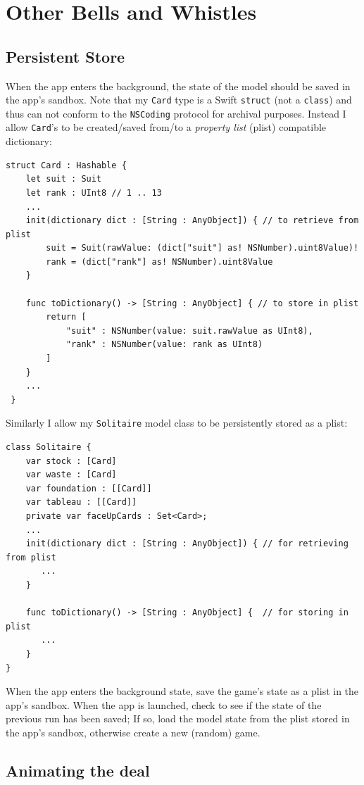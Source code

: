 \documentclass[11pt]{article}
\begin{document}
\section{Other Bells and Whistles} \label{sec:bells-and-whistles}

\subsection{Persistent Store}

When the app enters the background, the state of the model should
be saved in the app's sandbox. 
Note that my {\tt Card} type is a Swift {\tt struct} (not a {\tt class})
and thus can not conform to the {\tt NSCoding} protocol for archival purposes.
Instead I allow {\tt Card}'s to be created/saved from/to a {\em property
list} (plist) compatible dictionary:
\begin{verbatim}
struct Card : Hashable {
    let suit : Suit
    let rank : UInt8 // 1 .. 13
    ...
    init(dictionary dict : [String : AnyObject]) { // to retrieve from plist
        suit = Suit(rawValue: (dict["suit"] as! NSNumber).uint8Value)!
        rank = (dict["rank"] as! NSNumber).uint8Value
    }
    
    func toDictionary() -> [String : AnyObject] { // to store in plist
        return [
            "suit" : NSNumber(value: suit.rawValue as UInt8),
            "rank" : NSNumber(value: rank as UInt8)
        ]
    }
    ...    
 }   
\end{verbatim}
Similarly I allow my {\tt Solitaire} model class to be persistently stored
as a plist:
\begin{verbatim}
class Solitaire {
    var stock : [Card]
    var waste : [Card]
    var foundation : [[Card]]
    var tableau : [[Card]]
    private var faceUpCards : Set<Card>;
    ...
    init(dictionary dict : [String : AnyObject]) { // for retrieving from plist
       ...
    }
    
    func toDictionary() -> [String : AnyObject] {  // for storing in plist
       ...
    }
}
\end{verbatim}
When the app enters the background state, save the game's state
as a plist in the app's sandbox.
When the app is launched, check to see if the state of the
previous run has been saved; If so, load the model state from
the plist stored in the app's sandbox,
otherwise create a new (random) game.

\subsection{Animating the deal}
\end{document}
